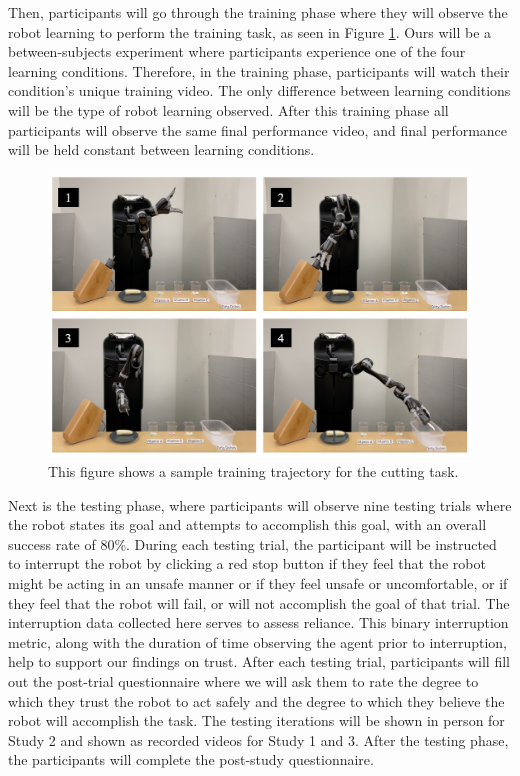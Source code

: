\documentclass[letterpaper]{article} %
\begin{document}
Then, participants will go through the training phase where they will observe the robot learning to perform the training task, as seen in Figure \ref{fig:training_flow}. Ours will be a between-subjects experiment where participants experience one of the four learning conditions. Therefore, in the training phase, participants will watch their condition's unique training video. The only difference between learning conditions will be the type of robot learning observed. After this training phase all participants will observe the same final performance video, and final performance will be held constant between learning conditions. 

\begin{figure}[ht]
    \centering
    \includegraphics[width=1\columnwidth]{Figures/training_flow.png}
  \caption{This figure shows a sample training trajectory for the cutting task.}
    \label{fig:training_flow}
\end{figure}

Next is the testing phase, where participants will observe nine testing trials where the robot states its goal and attempts to accomplish this goal, with an overall success rate of 80\%. During each testing trial, the participant will be instructed to interrupt the robot by clicking a red stop button if they feel that the robot might be acting in an unsafe manner or if they feel unsafe or uncomfortable, or if they feel that the robot will fail, or will not accomplish the goal of that trial. The interruption data collected here serves to assess reliance. This binary interruption metric, along with the duration of time observing the agent prior to interruption, help to support our findings on trust. After each testing trial, participants will fill out the post-trial questionnaire where we will ask them to rate the degree to which they trust the robot to act safely and the degree to which they believe the robot will accomplish the task. The testing iterations will be shown in person for Study 2 and shown as recorded videos for Study 1 and 3. After the testing phase, the participants will complete the post-study questionnaire.
\end{document}
